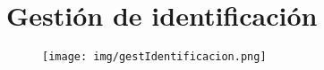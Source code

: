 \section{Gestión de identificación}
\begin{figure}[!h]
  \centering
    \texttt{[image: img/gestIdentificacion.png]}
    \caption{}
\end{figure}